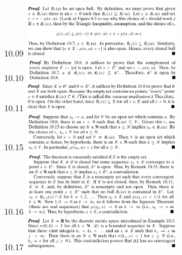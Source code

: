 \documentclass[8pt,landscape]{article}
\begin{document}
\begin{multicols}{3}
    10.09
    \includegraphics[width=250]{10_09.png} \\
    10.10
    \includegraphics[width=250]{10_10.png} \\
    10.11
    \includegraphics[width=250]{10_11.png} \\
    10.15
    \includegraphics[width=250]{10_15.png} \\
    10.16
    \includegraphics[width=250]{10_16.png} \\
    10.17
    \includegraphics[width=250]{10_17.png} \\

\end{multicols}
\end{document}

